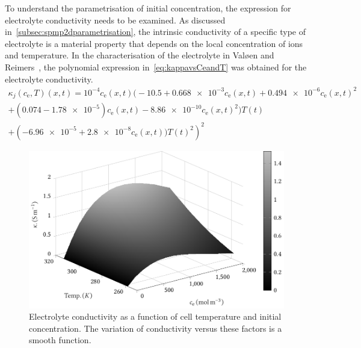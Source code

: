 To  understand  the parametrisation  of  initial  concentration, the  expression
for   electrolyte   conductivity   needs    to   be   examined.   As   discussed
in~\cref{subsec:spmp2dparametrisation}, the intrinsic conductivity of a specific
type  of  electrolyte  is  a  material   property  that  depends  on  the  local
concentration of  ions and  temperature. In the characterisation of the
electrolyte in Valøen and  Reimers~\cite{Valoen2005}, the polynomial expression
in~\cref{eq:kappavsCeandT} was obtained for the electrolyte conductivity.
\begin{multline}\label{eq:kappavsCeandT}
    \kappa_j(c_\text{e},T)(x,t) =  10^{-4} c_\text{e}(x,t) \bigl(-10.5 + \num{0.668e-3} c_\text{e}(x,t) + \num{0.494e-6}  c_\text{e}(x,t)^2\\
        + (0.074 - \num{1.78e-5}) c_\text{e}(x,t) - \num{8.86e-10}
    c_\text{e}(x,t)^2 \bigr)T(t)\\
	+ \left(\num{-6.96e-5} + \num{2.8e-8} c_\text{e}(x,t))T(t)^2\right)^2
\end{multline}

\begin{figure}[tb]
    \centering
    \includegraphics{4/figures/m2t_kappa_ce_T.pdf}
    \caption[Surface plot of electrolyte conductivity]
    {Electrolyte conductivity as a function of cell temperature and initial
        concentration. The variation of conductivity versus these factors is a
    smooth function.}
    \label{fig:kappavsCeandT}
\end{figure}

